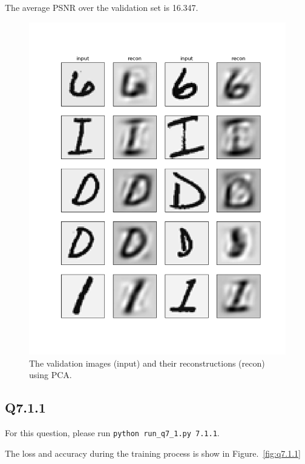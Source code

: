 \documentclass[11pt]{article}
\newcommand{\code}[1]{\texttt{#1}}
\begin{document}
The average PSNR over the validation set is 16.347.

\begin{figure}[h!]
    \centering
    \includegraphics[width=.8\linewidth]{../results/q6_2.png}
    \caption{The validation images (input) and their reconstructions (recon) using PCA. }
    \label{fig:q6.2}
\end{figure}

\newpage
\subsection*{Q7.1.1}

For this question, please run \code{python run\_q7\_1.py 7.1.1}.

The loss and accuracy during the training process is show in Figure.~\ref{fig:q7.1.1}
\end{document}
